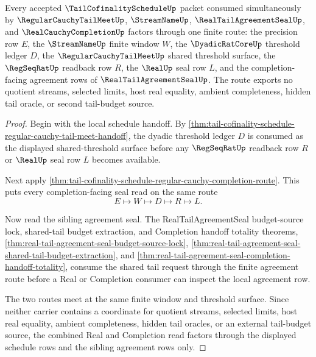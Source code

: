 \begin{theorem}
\label{thm:tail-cofinality-schedule-shared-tail-budget-factorization}
Every accepted $\TailCofinalityScheduleUp$ packet consumed simultaneously by $\RegularCauchyTailMeetUp$, $\StreamNameUp$, $\RealTailAgreementSealUp$, and $\RealCauchyCompletionUp$ factors through one finite route: the precision row $E$, the $\StreamNameUp$ finite window $W$, the $\DyadicRatCoreUp$ threshold ledger $D$, the $\RegularCauchyTailMeetUp$ shared threshold surface, the $\RegSeqRatUp$ readback row $R$, the $\RealUp$ seal row $L$, and the completion-facing agreement rows of $\RealTailAgreementSealUp$. The route exports no quotient streams, selected limits, host real equality, ambient completeness, hidden tail oracle, or second tail-budget source.
\end{theorem}
\begin{proof}
Begin with the local schedule handoff. By \autoref{thm:tail-cofinality-schedule-regular-cauchy-tail-meet-handoff}, the dyadic threshold ledger $D$ is consumed as the displayed shared-threshold surface before any $\RegSeqRatUp$ readback row $R$ or $\RealUp$ seal row $L$ becomes available.

Next apply \autoref{thm:tail-cofinality-schedule-regular-cauchy-completion-route}. This puts every completion-facing seal read on the same route
$$
E \longmapsto W \longmapsto D \longmapsto R \longmapsto L.
$$

Now read the sibling agreement seal. The RealTailAgreementSeal budget-source lock, shared-tail budget extraction, and Completion handoff totality theorems, \autoref{thm:real-tail-agreement-seal-budget-source-lock}, \autoref{thm:real-tail-agreement-seal-shared-tail-budget-extraction}, and \autoref{thm:real-tail-agreement-seal-completion-handoff-totality}, consume the shared tail request through the finite agreement route before a Real or Completion consumer can inspect the local agreement row.

The two routes meet at the same finite window and threshold surface. Since neither carrier contains a coordinate for quotient streams, selected limits, host real equality, ambient completeness, hidden tail oracles, or an external tail-budget source, the combined Real and Completion read factors through the displayed schedule rows and the sibling agreement rows only.
\end{proof}

